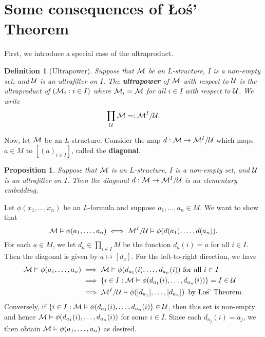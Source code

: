 \documentclass[10pt]{article}
\makeatletter
\theoremstyle{newstyle}
\newtheorem{prop}[thm]{Proposition}
\newtheorem{defn}[thm]{Definition}
\newenvironment{pf}[1][\proofname]{\par
  \pushQED{\qed}%
  \normalfont \topsep0\p@\relax
  \trivlist
  \item[\hskip\labelsep\scshape
  #1\@addpunct{.}]\ignorespaces
}{%
  \popQED\endtrivlist\@endpefalse
}
\makeatother
\begin{document}
\newpage 
\section{Some consequences of \L{}o\'s' Theorem}

First, we introduce a special case of the ultraproduct. 

\begin{defn}[Ultrapower]
Suppose that ${\cal M}$ be an $L$-structure, $I$ is a non-empty set, and 
${\cal U}$ is an ultrafilter on $I$. The {\bf ultrapower} of ${\cal M}$ with respect to ${\cal U}$ 
is the ultraproduct of $({\cal M}_i : i \in I)$ where ${\cal M}_i = {\cal M}$ for all $i \in I$ 
with respect to ${\cal U}$. We write 
\[ \prod_{\cal U} {\cal M} =: {\cal M}^I / {\cal U}. \]
\end{defn}

Now, let ${\cal M}$ be an $L$-structure. Consider the map $d : {\cal M} \to {\cal M}^I / {\cal U}$ 
which maps $a \in M$ to $[(a)_{i \in I}]$, called the {\bf diagonal}. 

\begin{prop}
Suppose that ${\cal M}$ is an $L$-structure, $I$ is a non-empty set, and ${\cal U}$ is an 
ultrafilter on $I$. Then the diagonal $d : {\cal M} \to {\cal M}^I / {\cal U}$ is an elementary embedding.
\end{prop}
\begin{pf}
Let $\phi(x_1, \dots, x_n)$ be an $L$-formula and suppose $a_1, \dots, a_n \in M$. We want to show that 
\[ {\cal M} \vDash \phi(a_1, \dots, a_n) \iff {\cal M}^I / {\cal U} \vDash 
\phi(d(a_1), \dots, d(a_n)). \]
For each $a \in M$, we let $d_a \in \prod_{i \in I} M$ be the function 
$d_a(i) = a$ for all $i \in I$. Then the diagonal is given by $a \mapsto [d_a]$. 
For the left-to-right direction, we have 
\begin{align*}
    {\cal M} \vDash \phi(a_1, \dots, a_n) &\;\Longrightarrow\; {\cal M} \vDash 
    \phi(d_{a_1}(i), \dots, d_{a_n}(i)) \text{ for all } i \in I \\ 
    &\;\Longrightarrow\; \{i \in I : {\cal M} \vDash \phi(d_{a_1}(i), \dots, d_{a_n}(i)) \} = I \in {\cal U} \\
    &\;\Longrightarrow\; {\cal M}^I / {\cal U} \vDash \phi([d_{a_1}], \dots, [d_{a_n}]) \, \text{ by 
    \L{}o\'s' Theorem}.
\end{align*}
Conversely, if $\{i \in I : {\cal M} \vDash \phi(d_{a_1}(i), \dots, d_{a_n}(i)\} \in {\cal U}$, 
then this set is non-empty and hence ${\cal M} \vDash \phi(d_{a_1}(i), \dots, d_{a_n}(i))$ 
for some $i \in I$. Since each $d_{a_j}(i) = a_j$, we then obtain 
${\cal M} \vDash \phi(a_1, \dots, a_n)$ as desired. 
\end{pf}
\end{document}
